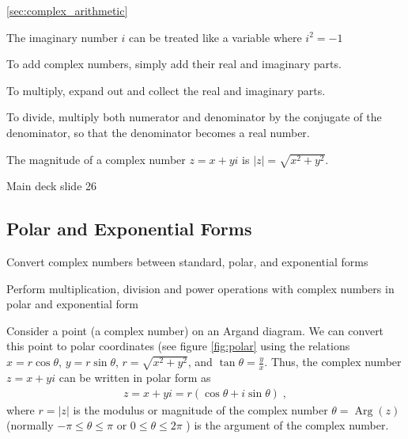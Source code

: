 \goodbreak
\begin{recap}{\ref{sec:complex_arithmetic}}

\item The imaginary number $i$ can be treated like a variable where ${i}^{2}=-1$

\item To add complex numbers, simply add their real and imaginary parts.

\item To multiply, expand out and collect the real and imaginary parts.

\item To divide, multiply both numerator and denominator by the conjugate of the denominator, so that the denominator becomes a real number.

\item The magnitude of a complex number $z=x+yi$ is $\left|z\right|=\sqrt{{x}^{2}+{y}^{2}}$.

\end{recap}

Main deck slide 26

\newtexpage
\subsection{Polar and Exponential Forms}
\label{sec:complex_polar}

\begin{learningoutcomes}
\item Convert complex numbers between standard, polar, and exponential forms
\item Perform multiplication, division and power operations with complex numbers in polar and exponential form
\end{learningoutcomes}


Consider a point (a complex number) on an Argand diagram. We can convert this point to polar coordinates (see figure \ref{fig:polar} using the relations
$x=r \cos \theta$, $y=r \sin \theta $, $r=\sqrt{{x}^{2}+{y}^{2}}$, and $\tan \theta =\frac{y}{x}$. Thus, the complex number $z = x + yi $ can be written in polar form as
\begin{align}
    z = x+yi = r(\cos \theta +i\sin \theta ) \; ,
\end{align}
where $r=\left|z\right|$ is the modulus or magnitude of the complex number $\theta =\operatorname{Arg}(z)$ (normally $-\pi \leq \theta \leq \pi $ or $0 \leq \theta \leq 2\pi$ ) is the argument of the complex number.

